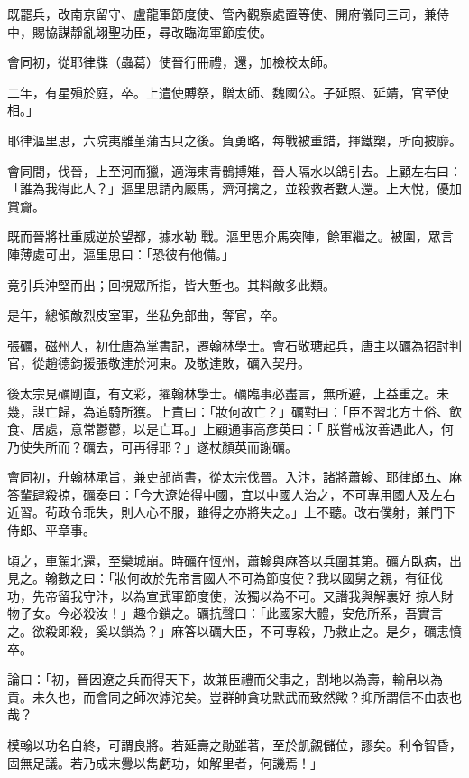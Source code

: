 \begin{pinyinscope}
 既罷兵，改南京留守、盧龍軍節度使、管內觀察處置等使、開府儀同三司，兼侍中，賜協謀靜亂翊聖功臣，尋改臨海軍節度使。



 會同初，從耶律牒（蟲葛）使晉行冊禮，還，加檢校太師。



 二年，有星殞於庭，卒。上遣使賻祭，贈太師、魏國公。子延照、延靖，官至使相。」



 耶律漚里思，六院夷離堇蒲古只之後。負勇略，每戰被重錯，揮鐵槊，所向披靡。



 會同間，伐晉，上至河而獵，適海東青鶻搏雉，晉人隔水以鴿引去。上顧左右曰：「誰為我得此人？」漚里思請內廄馬，濟河擒之，並殺救者數人還。上大悅，優加賞齎。



 既而晉將杜重威逆於望都，據水勒
 戰。漚里思介馬突陣，餘軍繼之。被圍，眾言陣薄處可出，漚里思曰：「恐彼有他備。」



 竟引兵沖堅而出；回視眾所指，皆大塹也。其料敵多此類。



 是年，總領敵烈皮室軍，坐私免部曲，奪官，卒。



 張礪，磁州人，初仕唐為掌書記，遷翰林學士。會石敬瑭起兵，唐主以礪為招討判官，從趙德鈞援張敬達於河東。及敬達敗，礪入契丹。



 後太宗見礪剛直，有文彩，擢翰林學士。礪臨事必盡言，無所避，上益重之。未幾，謀亡歸，為追騎所獲。上責曰：「妝何故亡？」礪對曰：「臣不習北方土俗、飲食、居處，意常鬱鬱，以是亡耳。」上顧通事高彥英曰：「
 朕嘗戒汝善遇此人，何乃使失所而？礪去，可再得耶？」遂杖顏英而謝礪。



 會同初，升翰林承旨，兼吏部尚書，從太宗伐晉。入汴，諸將蕭翰、耶律郎五、麻答輩肆殺掠，礪奏曰：「今大遼始得中國，宜以中國人治之，不可專用國人及左右近習。茍政令乖失，則人心不服，雖得之亦將失之。」上不聽。改右僕射，兼門下侍郎、平章事。



 頃之，車駕北還，至欒城崩。時礪在恆州，蕭翰與麻答以兵圍其第。礪方臥病，出見之。翰數之曰：「妝何故於先帝言國人不可為節度使？我以國舅之親，有征伐功，先帝留我守汴，以為宣武軍節度使，汝獨以為不可。又譖我與解裏好
 掠人財物子女。今必殺汝！」趣令鎖之。礪抗聲曰：「此國家大體，安危所系，吾實言之。欲殺即殺，奚以鎖為？」麻答以礪大臣，不可專殺，乃救止之。是夕，礪恚憤卒。



 論曰：「初，晉因遼之兵而得天下，故兼臣禮而父事之，割地以為壽，輸帛以為貢。未久也，而會同之師次滹沱矣。豈群帥貪功默武而致然歟？抑所謂信不由衷也哉？



 模翰以功名自終，可謂良將。若延壽之勛雖著，至於凱覦儲位，謬矣。利令智昏，固無足議。若乃成末釁以雋虧功，如解里者，何譏焉！」



\end{pinyinscope}